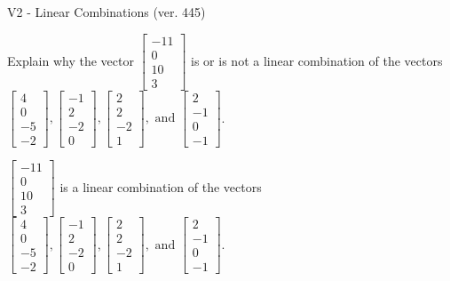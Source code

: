 \begin{exercise}
  \begin{exerciseTitle}V2 - Linear Combinations (ver. 445)\end{exerciseTitle}
  \begin{exerciseStatement}
    Explain why the vector \(\left[\begin{array}{c}
-11 \\
0 \\
10 \\
3
\end{array}\right]\)  is or is not a linear 
	combination of the vectors \(\left[\begin{array}{c}
4 \\
0 \\
-5 \\
-2
\end{array}\right] , \left[\begin{array}{c}
-1 \\
2 \\
-2 \\
0
\end{array}\right] , \left[\begin{array}{c}
2 \\
2 \\
-2 \\
1
\end{array}\right] , \text{ and } \left[\begin{array}{c}
2 \\
-1 \\
0 \\
-1
\end{array}\right]\).
	


  \end{exerciseStatement}
  \begin{exerciseAnswer}
   \(\left[\begin{array}{c}
-11 \\
0 \\
10 \\
3
\end{array}\right]\) 
  	 is  
	a linear combination of the vectors \(\left[\begin{array}{c}
4 \\
0 \\
-5 \\
-2
\end{array}\right] , \left[\begin{array}{c}
-1 \\
2 \\
-2 \\
0
\end{array}\right] , \left[\begin{array}{c}
2 \\
2 \\
-2 \\
1
\end{array}\right] , \text{ and } \left[\begin{array}{c}
2 \\
-1 \\
0 \\
-1
\end{array}\right]\).


\end{exerciseAnswer}
\end{exercise}
